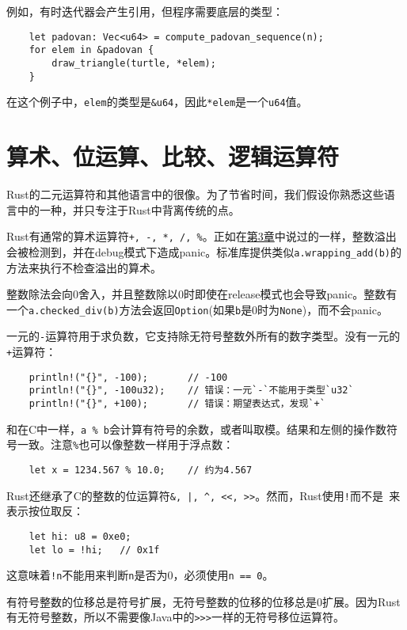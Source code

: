 例如，有时迭代器会产生引用，但程序需要底层的类型：
\begin{verbatim}
    let padovan: Vec<u64> = compute_padovan_sequence(n);
    for elem in &padovan {
        draw_triangle(turtle, *elem);
    }
\end{verbatim}

在这个例子中，\texttt{elem}的类型是\texttt{\&u64}，因此\texttt{*elem}是一个\texttt{u64}值。

\section{算术、位运算、比较、逻辑运算符}

Rust的二元运算符和其他语言中的很像。为了节省时间，我们假设你熟悉这些语言中的一种，并只专注于Rust中背离传统的点。

Rust有通常的算术运算符\texttt{+, -, *, /, \%}。正如在\hyperref[ch03]{第3章}中说过的一样，整数溢出会被检测到，并在debug模式下造成panic。标准库提供类似\texttt{a.wrapping\_add(b)}的方法来执行不检查溢出的算术。

整数除法会向0舍入，并且整数除以0时即使在release模式也会导致panic。整数有一个\texttt{a.checked\_div(b)}方法会返回\texttt{Option}(如果\texttt{b}是0时为\texttt{None})，而不会panic。

一元的\texttt{-}运算符用于求负数，它支持除无符号整数外所有的数字类型。没有一元的\texttt{+}运算符：
\begin{verbatim}
    println!("{}", -100);       // -100
    println!("{}", -100u32);    // 错误：一元`-`不能用于类型`u32`
    println!("{}", +100);       // 错误：期望表达式，发现`+`
\end{verbatim}

和在C中一样，\texttt{a \% b}会计算有符号的余数，或者叫取模。结果和左侧的操作数符号一致。注意\texttt{\%}也可以像整数一样用于浮点数：
\begin{verbatim}
    let x = 1234.567 % 10.0;    // 约为4.567
\end{verbatim}

Rust还继承了C的整数的位运算符\texttt{\&, |, \^{}, <<, >>}。然而，Rust使用\texttt{!}而不是\texttt{~}来表示按位取反：
\begin{verbatim}
    let hi: u8 = 0xe0;
    let lo = !hi;   // 0x1f
\end{verbatim}

这意味着\texttt{!n}不能用来判断\texttt{n}是否为0，必须使用\texttt{n == 0}。

有符号整数的位移总是符号扩展，无符号整数的位移的位移总是0扩展。因为Rust有无符号整数，所以不需要像Java中的\texttt{>>>}一样的无符号移位运算符。

